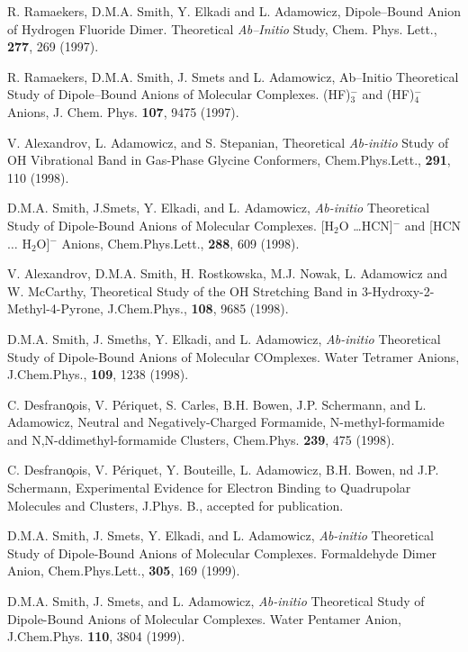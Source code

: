 \begin{thebibliography}{999}
R. Ramaekers, D.M.A. Smith, Y. Elkadi and 
L. Adamowicz, Dipole--Bound Anion
of Hydrogen Fluoride Dimer.  Theoretical 
{\it Ab--Initio} Study, Chem. Phys. Lett.,
{\bf 277}, 269 (1997).

R. Ramaekers, D.M.A. Smith, J. Smets 
and L. Adamowicz, Ab--Initio Theoretical
Study of Dipole--Bound Anions of Molecular 
Complexes. (HF)$_3^-$ and (HF)$_4^-$ Anions,
J. Chem. Phys.
{\bf 107}, 9475 (1997).

V. Alexandrov, L. Adamowicz, and S. Stepanian,
Theoretical {\it Ab-initio} Study of OH Vibrational Band
in Gas-Phase Glycine Conformers, Chem.Phys.Lett.,
{\bf 291}, 110 (1998).

D.M.A. Smith, J.Smets, Y. Elkadi, and L. Adamowicz,
{\it Ab-initio} Theoretical Study of Dipole-Bound Anions
of Molecular Complexes. [H$_2$O \dots HCN]$^-$ and
[HCN $\dots$ H$_2$O]$^-$ Anions,
Chem.Phys.Lett., {\bf 288}, 609 (1998).

V. Alexandrov, D.M.A. Smith, H. Rostkowska, M.J. Nowak, 
L. Adamowicz and W. McCarthy, 
Theoretical Study of the OH Stretching Band in 3-Hydroxy-2-Methyl-4-Pyrone,
J.Chem.Phys., {\bf 108}, 9685 (1998).

D.M.A. Smith, J. Smeths, Y. Elkadi, and L. Adamowicz,
{\it Ab-initio} Theoretical Study of Dipole-Bound Anions
of Molecular COmplexes. Water Tetramer Anions,
J.Chem.Phys., {\bf 109}, 1238 (1998).


C. Desfran\c{o}ois, V. P\'{e}riquet, S. Carles, B.H. Bowen,
J.P. Schermann, and L. Adamowicz,
Neutral and Negatively-Charged Formamide, N-methyl-formamide
and N,N-ddimethyl-formamide Clusters, Chem.Phys.
{\bf 239}, 475 (1998).

C. Desfran\c{o}ois, V. P\'{e}riquet, Y. Bouteille, 
L. Adamowicz, B.H. Bowen,
nd J.P. Schermann,
Experimental Evidence for Electron Binding to
Quadrupolar Molecules and Clusters,
J.Phys. B., accepted for publication.


D.M.A. Smith, J. Smets, Y. Elkadi, and L. Adamowicz,
{\it Ab-initio} Theoretical Study of  Dipole-Bound Anions
of Molecular Complexes. Formaldehyde Dimer Anion,
Chem.Phys.Lett., {\bf 305}, 169 (1999).


D.M.A. Smith, J. Smets, and L. Adamowicz,
{\it Ab-initio} Theoretical Study of Dipole-Bound Anions of
Molecular Complexes. Water Pentamer Anion,
J.Chem.Phys. {\bf 110}, 3804 (1999).



\end{thebibliography}

